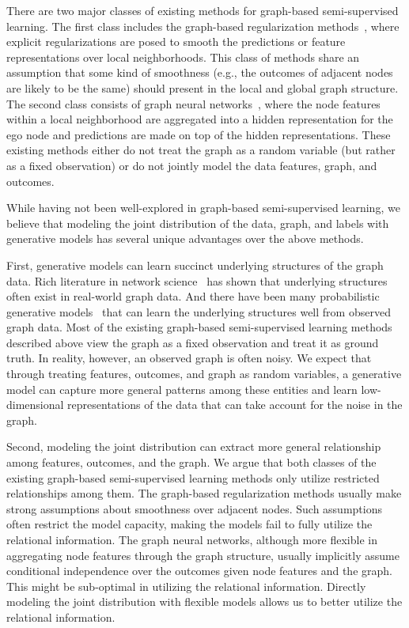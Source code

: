\documentclass{article}
\begin{document}
There are two major classes of existing methods for graph-based semi-supervised learning. The first class includes the graph-based regularization methods~\cite{zhu2003semi,zhou2004learning,belkin2006manifold,mei2008general,li2019prediction}, where explicit regularizations are posed to smooth the predictions or feature representations over local neighborhoods. This class of methods share an assumption that some kind of smoothness (e.g., the outcomes of adjacent nodes are likely to be the same) should present in the local and global graph structure. The second class consists of graph neural networks~\cite{kipf2016semi,hamilton2017inductive,velivckovic2017graph}, where the node features within a local neighborhood are aggregated into a hidden representation for the ego node and predictions are made on top of the hidden representations. These existing methods either do not treat the graph as a random variable (but rather as a fixed observation) or do not jointly model the data features, graph, and outcomes.  

While having not been well-explored in graph-based semi-supervised learning, we believe that modeling the joint distribution of the data, graph, and labels with generative models has several unique advantages over the above methods. 

First, generative models can learn succinct underlying structures of the graph data. Rich literature in network science~\cite{newman2010networks} has shown that underlying structures often exist in real-world graph data. And there have been many probabilistic generative models~\cite{holland1983stochastic,hoff2002latent} that can learn the underlying structures well from observed graph data. Most of the existing graph-based semi-supervised learning methods described above view the graph as a fixed observation and treat it as ground truth. In reality, however, an observed graph is often noisy. We expect that through treating features, outcomes, and graph as random variables, a generative model can capture more general patterns among these entities and learn low-dimensional representations of the data that can take account for the noise in the graph.  

Second, modeling the joint distribution can extract more general relationship among features, outcomes, and the graph. We argue that both classes of the existing graph-based semi-supervised learning methods only utilize restricted relationships among them. The graph-based regularization methods usually make strong assumptions about smoothness over adjacent nodes. Such assumptions often restrict the model capacity, making the models fail to fully utilize the relational information. The graph neural networks, although more flexible in aggregating node features through the graph structure, usually implicitly assume conditional independence over the outcomes given node features and the graph. This might be sub-optimal in utilizing the relational information. Directly modeling the joint distribution with flexible models allows us to better utilize the relational information.
\end{document}
